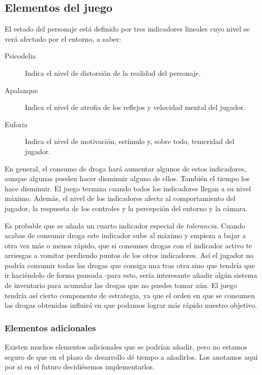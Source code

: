 \documentclass[a4paper,10pt,spanish]{article}
\begin{document}
\begin{description}

\subsection{Elementos del juego}

El estado del personaje está definido por tres indicadores lineales cuyo nivel se verá afectado por el entorno, a saber:

\begin{description}
\item[Psicodelia] Indica el nivel de distorsión de la realidad del personaje.
\item[Apalanque] Indica el nivel de atrofia de los reflejos y velocidad mental del jugador.
\item[Euforia] Indica el nivel de motivación, estímulo y, sobre todo, temeridad del jugador.
\end{description}

En general, el consumo de droga hará aumentar algunos de estos indicadores, aunque algunas pueden hacer disminuir alguno de ellos. También el tiempo los hace disminuir. El juego termina cuando todos los indicadores llegan a su nivel máximo. Además, el nivel de los indicadores afecta al comportamiento del jugador, la respuesta de los controles y la percepción del entorno y la cámara.

Es probable que se añada un cuarto indicador especial de \emph{tolerancia}. Cuando acabas de consumir droga este indicador sube al máximo y empieza a bajar a otra vez más o menos rápido, que si consumes drogas con el indicador activo te arriesgas a vomitar perdiendo puntos de los otros indicadores. Así el jugador no podría consumir todas las drogas que consiga una tras otra sino que tendría que ir haciéndolo de forma pausada -para esto, sería interesante añadir algún sistema de inventario para acumular las drogas que no puedes tomar aún. El juego tendría así cierto componente de estrategia, ya que el orden en que se consumen las drogas obtenidas influirá en que podamos lograr más rápido nuestro objetivo.

\subsubsection{Elementos adicionales}

Existen muchos elementos adicionales que se podrían añadir, pero no estamos seguro de que en el plazo de desarrollo dé tiempo a añadirlos. Los anotamos aquí por si en el futuro decidiésemos implementarlos.


\end{description}
\end{document}
